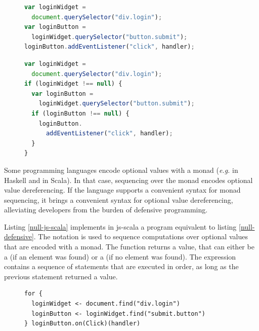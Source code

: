 \documentclass[preprint]{sigplanconf}
\newcommand{\eg}{\emph{e.g.}}
\begin{document}
\begin{figure}
\begin{lstlisting}[language=JavaScript,label=null-unsafe,caption=Unsafe code]
var loginWidget =
  document.querySelector("div.login");
var loginButton =
  loginWidget.querySelector("button.submit");
loginButton.addEventListener("click", handler);
\end{lstlisting}
\end{figure}


\begin{figure}
\begin{lstlisting}[language=JavaScript,label=null-defensive,caption=Defensive programming to handle null references]
var loginWidget =
  document.querySelector("div.login");
if (loginWidget !== null) {
  var loginButton =
    loginWidget.querySelector("button.submit");
  if (loginButton !== null) {
    loginButton.
      addEventListener("click", handler);
  }
}
\end{lstlisting}
\end{figure}

Some programming languages encode optional values with a monad (\eg {} in Haskell and  in
Scala). In that case, sequencing over the monad encodes optional value dereferencing. If the language supports a
convenient syntax for monad sequencing, it brings a convenient syntax for optional value dereferencing, alleviating
developers from the burden of defensive programming.

Listing \ref{null-js-scala} implements in js-scala a program equivalent to listing \ref{null-defensive}. The
 notation is used to sequence computations over optional values that are encoded with a monad. The
 function returns a  value, that can either be a  (if
an element was found) or a  (if no element was found). The  expression contains a
sequence of statements that are executed in order, as long as the previous statement returned a
 value.

\begin{figure}
\begin{lstlisting}[label=null-js-scala,caption=Handling null references in js-scala]
for {
  loginWidget <- document.find("div.login")
  loginButton <- loginWidget.find("submit.button")
} loginButton.on(Click)(handler)
\end{lstlisting}
\end{figure}
\end{document}
